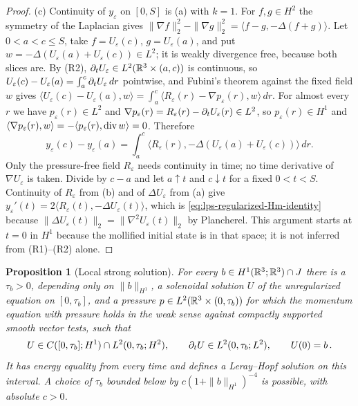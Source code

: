 \documentclass[11pt,letterpaper]{article}
\numberwithin{equation}{section}
\theoremstyle{plain}
\newtheorem{proposition}[theorem]{Proposition}
\theoremstyle{definition}
\theoremstyle{remark}
\begin{document}
\begin{proof}
(c) Continuity of $y_\varepsilon$ on $[0,S]$ is (a) with $k=1$. For $f,g\in H^2$
the symmetry of the Laplacian gives
$\|\nabla f\|_2^2-\|\nabla g\|_2^2=\langle f-g,-\Delta(f+g)\rangle$.
Let $0<a<c\le S$, take $f=U_\varepsilon(c)$, $g=U_\varepsilon(a)$, and put
$w=-\Delta(U_\varepsilon(a)+U_\varepsilon(c))\in L^2$; it is weakly
divergence free, because both slices are. By (R2),
$\partial_t U_\varepsilon\in L^2(\mathbb{R}^3\times(a,c))$ is continuous, so
$U_\varepsilon(c)-U_\varepsilon(a)=\int_a^c\partial_t U_\varepsilon\,dr$
pointwise, and Fubini's theorem against the fixed field $w$ gives
$\langle U_\varepsilon(c)-U_\varepsilon(a),w\rangle
=\int_a^c\langle R_\varepsilon(r)-\nabla p_\varepsilon(r),w\rangle\,dr$.
For almost every $r$ we have $p_\varepsilon(r)\in L^2$ and
$\nabla p_\varepsilon(r)=R_\varepsilon(r)-\partial_t U_\varepsilon(r)\in L^2$, so
$p_\varepsilon(r)\in H^1$ and $\langle\nabla p_\varepsilon(r),w\rangle
=-\langle p_\varepsilon(r),\operatorname{div} w\rangle=0$. Therefore
\[
y_\varepsilon(c)-y_\varepsilon(a)
=\int_a^c\big\langle R_\varepsilon(r),
 -\Delta(U_\varepsilon(a)+U_\varepsilon(c))\big\rangle\,dr .
\]
Only the pressure-free field $R_\varepsilon$ needs continuity in time; no time
derivative of $\nabla U_\varepsilon$ is taken. Divide by $c-a$ and let
$a\uparrow t$ and $c\downarrow t$ for a fixed $0<t<S$. Continuity of $R_\varepsilon$
from (b) and of $\Delta U_\varepsilon$ from (a) give
$y_\varepsilon'(t)=2\langle R_\varepsilon(t),-\Delta U_\varepsilon(t)\rangle$,
which is \eqref{eq:lps-regularized-Hm-identity} because
$\|\Delta U_\varepsilon(t)\|_2=\|\nabla^2U_\varepsilon(t)\|_2$ by Plancherel.
This argument starts at $t=0$ in $H^1$ because the mollified initial state is
in that space; it is not inferred from (R1)--(R2) alone.
\end{proof}

\begin{proposition}[Local strong solution]\label{prop:lps-local-strong}
For every $b\in H^1(\mathbb{R}^3;\mathbb{R}^3)\cap J$ there is a
$\tau_b>0$, depending only on $\|b\|_{H^1}$, a solenoidal solution $U$
of the unregularized equation on $[0,\tau_b]$, and a pressure
$p\in L^2(\mathbb{R}^3\times(0,\tau_b))$ for which the momentum equation with
pressure holds in the weak sense against compactly supported smooth vector
tests, such that
\begin{equation}\label{eq:lps-strong-class}
U\in C([0,\tau_b];H^1)\cap L^2(0,\tau_b;H^2),
\qquad \partial_t U\in L^2(0,\tau_b;L^2),\qquad U(0)=b\,.
\end{equation}
It has energy equality from every time and defines a Leray--Hopf
solution on this interval. A choice of $\tau_b$ bounded below by
$c(1+\|b\|_{H^1})^{-4}$ is possible, with absolute $c>0$.
\end{proposition}
\end{document}
